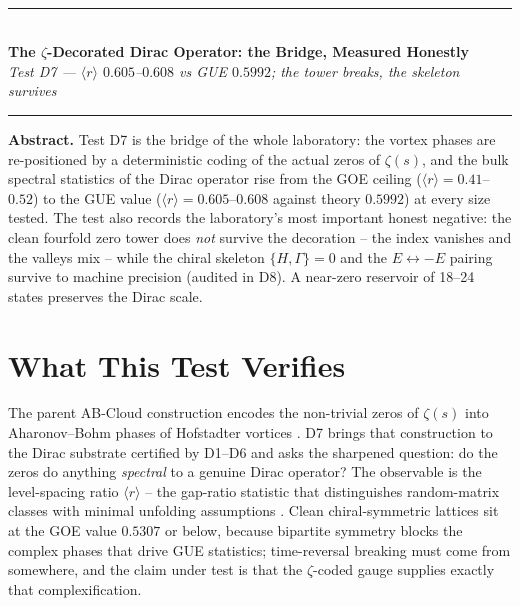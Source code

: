 \documentclass[11pt,a4paper]{article}
\begin{document}
\\[0.3em]
\rule{\textwidth}{0.8pt}\\[0.6em]
{\LARGE\bfseries\color{labblue} The $\zeta$-Decorated Dirac Operator: the Bridge, Measured Honestly}\\[0.5em]
{\normalsize\itshape Test D7 — $\langle r\rangle$ $0.605$–$0.608$ vs GUE $0.5992$; the tower breaks, the skeleton survives}\\[0.4em]
\rule{\textwidth}{0.4pt}

\begin{tcolorbox}[colback=labgreen!8, colframe=labgreen!70!black, title={Verdict: PASS — 5/5 checks}, fonttitle=\bfseries, boxrule=0.6pt]
\textbf{Abstract.} Test D7 is the bridge of the whole laboratory: the vortex phases are re-positioned by a deterministic coding of the actual zeros of $\zeta(s)$, and the bulk spectral statistics of the Dirac operator rise from the GOE ceiling ($\langle r\rangle = 0.41$--$0.52$) to the GUE value ($\langle r\rangle = 0.605$--$0.608$ against theory $0.5992$) at every size tested. The test also records the laboratory's most important honest negative: the clean fourfold zero tower does \emph{not} survive the decoration -- the index vanishes and the valleys mix -- while the chiral skeleton $\{H,\Gamma\} = 0$ and the $E \leftrightarrow -E$ pairing survive to machine precision (audited in D8). A near-zero reservoir of 18--24 states preserves the Dirac scale.
\end{tcolorbox}

\section{What This Test Verifies}
The parent AB-Cloud construction encodes the non-trivial zeros of $\zeta(s)$ into Aharonov--Bohm phases of Hofstadter vortices \cite{parent,ab}. D7 brings that construction to the Dirac substrate certified by D1--D6 and asks the sharpened question: do the zeros do anything \emph{spectral} to a genuine Dirac operator? The observable is the level-spacing ratio $\langle r\rangle$ -- the gap-ratio statistic that distinguishes random-matrix classes with minimal unfolding assumptions \cite{guhr,mehta}. Clean chiral-symmetric lattices sit at the GOE value $0.5307$ or below, because bipartite symmetry blocks the complex phases that drive GUE statistics; time-reversal breaking must come from somewhere, and the claim under test is that the $\zeta$-coded gauge supplies exactly that complexification.
\end{document}
